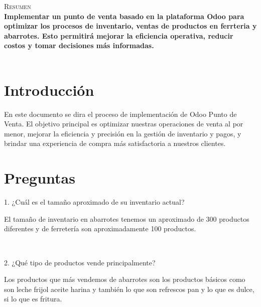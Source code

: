 \documentclass[12pt]{report}
\begin{document}
\restoregeometry
\thispagestyle{empty}
\begin{center}
\textsc{\Huge Resumen}\\[0.5cm]
\textbf{\large Implementar un punto de venta basado en la plataforma Odoo para optimizar los procesos de inventario, ventas de productos en ferrteria y abarrotes. Esto permitirá mejorar la eficiencia operativa, reducir costos y tomar decisiones más informadas. }\\[0.25cm]
\\[0.5cm]
\end{center}


\restoregeometry
\tableofcontents

\newpage
{}
\chapter{Introducción}

\large {En este documento se dira el proceso de implementación de Odoo Punto de Venta. El objetivo principal es optimizar nuestras operaciones de venta al por menor, mejorar la eficiencia y precisión en la gestión de inventario y pagos, y brindar una experiencia de compra más satisfactoria a nuestros clientes. }\\[0.25cm]

\newpage
{}
\chapter{Preguntas}

\large {
1. ¿Cuál es el tamaño aproximado de su inventario actual? 

El tamaño de inventario en abarrotes tenemos un aproximado de 300 productos diferentes y de ferretería son aproximadamente 100 productos.}\\[0.25cm]

\large {
2. ¿Qué tipo de productos vende principalmente?

Los productos que más vendemos de abarrotes son los productos básicos como son leche frijol aceite harina y también lo que son refrescos pan y lo que es dulce, si lo que es fritura.}\\[0.25cm]
\end{document}
